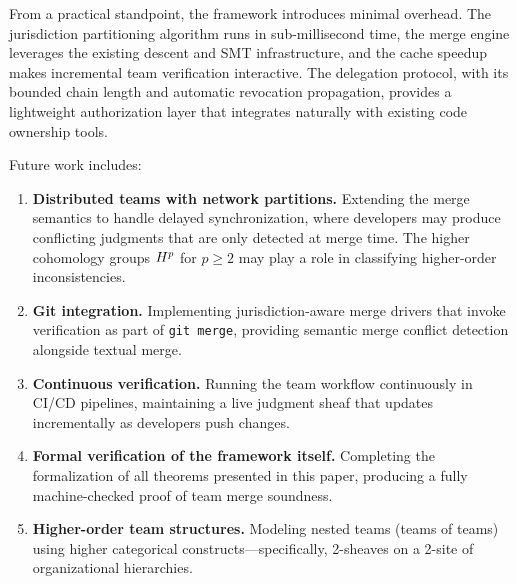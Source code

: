 \documentclass[11pt]{article}
\begin{document}
From a practical standpoint, the framework introduces minimal overhead. The
jurisdiction partitioning algorithm runs in sub-millisecond time, the merge
engine leverages the existing descent and SMT infrastructure, and the
\suppCacheSpeedup{} cache speedup makes incremental team verification
interactive. The delegation protocol, with its bounded chain length and
automatic revocation propagation, provides a lightweight authorization layer
that integrates naturally with existing code ownership tools.

Future work includes:
\begin{enumerate}[leftmargin=*]
  \item \textbf{Distributed teams with network partitions.} Extending the
        merge semantics to handle delayed synchronization, where developers
        may produce conflicting judgments that are only detected at merge time.
        The higher cohomology groups $H^{p}$ for $p \geq 2$ may play a
        role in classifying higher-order inconsistencies.
  \item \textbf{Git integration.} Implementing jurisdiction-aware merge
        drivers that invoke \JuGeo{} verification as part of \texttt{git merge},
        providing semantic merge conflict detection alongside textual merge.
  \item \textbf{Continuous verification.} Running the team workflow
        continuously in CI/CD pipelines, maintaining a live judgment sheaf
        that updates incrementally as developers push changes.
  \item \textbf{Formal verification of the framework itself.} Completing the
        \LEAN{} formalization of all theorems presented in this paper, producing
        a fully machine-checked proof of team merge soundness.
  \item \textbf{Higher-order team structures.} Modeling nested teams
        (teams of teams) using higher categorical constructs---specifically,
        2-sheaves on a 2-site of organizational hierarchies.
\end{enumerate}
\end{document}
